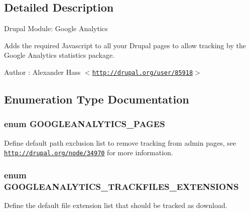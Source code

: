 \subsection{Detailed Description}
Drupal Module: Google Analytics

Adds the required Javascript to all your Drupal pages to allow tracking by the Google Analytics statistics package.

\begin{DoxyAuthor}{Author}
: Alexander Hass $<$\href{http://drupal.org/user/85918}{\tt http://drupal.org/user/85918}$>$ 
\end{DoxyAuthor}


\subsection{Enumeration Type Documentation}
\hypertarget{googleanalytics_8module_a641baa5dc31e9236204577c6f44e32cf}{
\subsubsection[{GOOGLEANALYTICS\_\-PAGES}]{\setlength{\rightskip}{0pt plus 5cm}enum {\bf GOOGLEANALYTICS\_\-PAGES}}}
\label{googleanalytics_8module_a641baa5dc31e9236204577c6f44e32cf}
Define default path exclusion list to remove tracking from admin pages, see \href{http://drupal.org/node/34970}{\tt http://drupal.org/node/34970} for more information. \hypertarget{googleanalytics_8module_aa0572ed144cfe47392ab87e9d6410f86}{
\subsubsection[{GOOGLEANALYTICS\_\-TRACKFILES\_\-EXTENSIONS}]{\setlength{\rightskip}{0pt plus 5cm}enum {\bf GOOGLEANALYTICS\_\-TRACKFILES\_\-EXTENSIONS}}}
\label{googleanalytics_8module_aa0572ed144cfe47392ab87e9d6410f86}
Define the default file extension list that should be tracked as download. 

